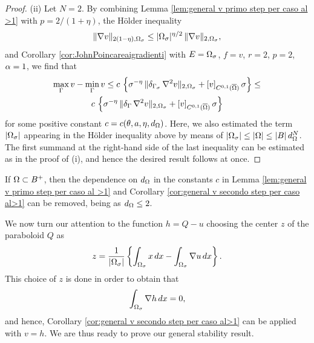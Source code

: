 \documentclass[a4paper,10pt]{amsart}
\numberwithin{equation}{section}
\begin{document}
\begin{proof}
(ii) Let $N=2$. By combining Lemma \ref{lem:general v primo step per caso al >1} with $p=2/(1+\eta)$, the H\"older inequality 
$$
\Vert \nabla v \Vert_{ 2 ( 1 - \eta) , \Omega_\sigma } \le  |\Omega_\sigma|^{\eta/2} \, \Vert \nabla v \Vert_{2, \Omega_\sigma} ,
$$
and Corollary \ref{cor:JohnPoincareaigradienti} with $E=\Omega_\sigma$, $f=v$, $r=2$, $p=2$, $\alpha=1$, we find that
\begin{multline*}
\max_{\Gamma} v - \min_{\Gamma} v \le 
c  \, \left\{ \sigma^{ - \eta } \, \Vert \delta_{\Gamma_\sigma} \, \nabla^2 v  \Vert_{2, \Omega_\sigma } + \left[ v \right]_{C^{0,1}(\overline{\Omega})} \sigma \right\} \le \\
c  \, \left\{ \sigma^{ - \eta } \, \Vert \delta_\Gamma \, \nabla^2 v  \Vert_{2, \Omega_\sigma } + \left[ v \right]_{C^{0,1}(\overline{\Omega})} \sigma \right\}
\end{multline*}
for some positive constant $c=c(\theta, a, \eta, d_\Omega )$. Here, we also estimated the term $|\Omega_\sigma|$ appearing in the H\"older inequality above by means of $|\Omega_\sigma| \le |\Omega|\le |B| \, d_\Omega^N$.
The first summand at the right-hand side of the last inequality  can be estimated as in the proof of (i), and hence the desired result follows at once. 
\end{proof}




\begin{rem}\label{rem:diametro e volume upper bound gratis}
{\rm
%
%
If $\Omega \subset B^+$, then the dependence on 
%
%
$d_\Omega$ in the constants $c$ in Lemma \ref{lem:general v primo step per caso al >1} and Corollary \ref{cor:general v secondo step per caso al>1} can be removed, being as 
%
%
$d_\Omega \le 2$.	
}
\end{rem}

We now turn our attention to the function $h=Q-u$ choosing the center $z$ of the paraboloid $Q$ as
\begin{equation}
\label{eq:choice z caso general al > 1}
	z = \frac{1}{| \Omega_{\sigma} |} \left\{\int_{ \Omega_{\sigma} } x \, dx - \int_{ \Omega_{\sigma} } \nabla u \, dx \right\}.
\end{equation}
This choice of $z$ is done in order to obtain that
$$
\int_{ \Omega_{\sigma} } \nabla h \, dx =0,
$$
and hence, Corollary \ref{cor:general v secondo step per caso al>1} 
can be applied with $v=h$.
We are thus ready to prove our general stability result.
\end{document}
